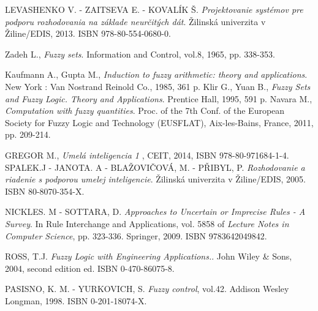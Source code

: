 \begin{thebibliography}{}                               
	 \label{literatura}


 LEVASHENKO V. - ZAITSEVA E. - KOVALÍK Š. {\it Projektovanie systémov pre podporu rozhodovania na základe neurčitých dát}. Žilinská univerzita v Žiline/EDIS, 2013. ISBN 978-80-554-0680-0.


 Zadeh L., {\it Fuzzy sets}. Information and Control, vol.8, 1965, pp. 338-353. 

 Kaufmann A., Gupta M., {\it Induction to fuzzy arithmetic: theory and applications}. New York : Van Nostrand Reinold Co., 1985, 361 p. 
Klir G., Yuan B., {\it Fuzzy Sets and Fuzzy Logic. Theory and Applications}. Prentice Hall, 1995, 591 p. 
Navara M., {\it Computation with fuzzy quantities}. Proc. of the 7th Conf. of the European Society for Fuzzy Logic and Technology (EUSFLAT), Aix-les-Bains, France, 2011, pp. 209-214.






 GREGOR M., {\it Umelá inteligencia 1} , CEIT, 2014, ISBN 978-80-971684-1-4.
 SPALEK.J - JANOTA. A - BLAŽOVIČOVÁ, M. - PŘIBYL, P. {\it Rozhodovanie a riadenie s podporou umelej inteligencie}. Žilinská univerzita v Žiline/EDIS, 2005. ISBN 80-8070-354-X. 

 NICKLES. M - SOTTARA, D. {\it Approaches to Uncertain or Imprecise Rules - A Survey}. In Rule Interchange and Applications, vol. 5858 of {\it Lecture Notes in Computer Science}, pp. 323-336. Springer, 2009. ISBN 9783642049842. 

 ROSS, T.J. {\it  Fuzzy Logic with Engineering Applications.}. John Wiley \& Sons, 2004, second edition ed. ISBN 0-470-86075-8. 



PASISNO, K. M. - YURKOVICH, S. {\it Fuzzy control}, vol.42. Addison Wesley Longman, 1998. ISBN 0-201-18074-X.  



\end{thebibliography}
